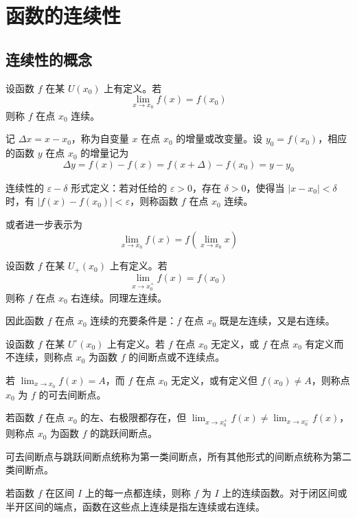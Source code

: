 \chapter{函数的连续性}

\section{连续性的概念}

\begin{definition}[连续性]
	设函数 $f$ 在某 $U(x_0)$ 上有定义。若
	$$\lim_{x\to x_0}f(x) = f(x_0)$$
	则称 $f$ 在点 $x_0$ 连续。
\end{definition}

记 $\Delta x = x-x_0$，称为自变量 $x$ 在点 $x_0$ 的增量或改变量。设 $y_0=f(x_0)$，相应的函数 $y$ 在点 $x_0$ 的增量记为
$$\Delta y = f(x)-f(x) = f(x+\Delta)-f(x_0) = y-y_0$$ 

连续性的 $\varepsilon-\delta$ 形式定义：若对任给的 $\varepsilon>0$，存在 $\delta>0$，使得当 $|x-x_0|<\delta$ 时，有 $|f(x)-f(x_0)|<\varepsilon$，则称函数 $f$ 在点 $x_0$ 连续。

或者进一步表示为
$$\lim_{x\to x_0}f(x) = f\left(\lim_{x\to x_0}x\right)$$

\begin{definition}
	设函数 $f$ 在某 $U_+(x_0)$ 上有定义。若
	$$\lim_{x\to x_0^+}f(x) = f(x_0)$$
	则称 $f$ 在点 $x_0$ 右连续。同理左连续。
\end{definition}

因此函数 $f$ 在点 $x_0$ 连续的充要条件是：$f$ 在点 $x_0$ 既是左连续，又是右连续。

\begin{definition}[间断点]
	设函数 $f$ 在某 $U^\circ(x_0)$ 上有定义。若 $f$ 在点 $x_0$ 无定义，或 $f$ 在点 $x_0$ 有定义而不连续，则称点 $x_0$ 为函数 $f$ 的间断点或不连续点。
\end{definition}

若 $\displaystyle\lim_{x\to x_0}f(x)=A$，而 $f$ 在点 $x_0$ 无定义，或有定义但 $f(x_0)\ne A$，则称点 $x_0$ 为 $f$ 的可去间断点。

若函数 $f$ 在点 $x_0$ 的左、右极限都存在，但 $\displaystyle\lim_{x\to x_0^+}f(x) \ne \lim_{x\to x_0^-}f(x)$，则称点 $x_0$ 为函数 $f$ 的跳跃间断点。

可去间断点与跳跃间断点统称为第一类间断点，所有其他形式的间断点统称为第二类间断点。

若函数 $f$ 在区间 $I$ 上的每一点都连续，则称 $f$ 为 $I$ 上的连续函数。对于闭区间或半开区间的端点，函数在这些点上连续是指左连续或右连续。

